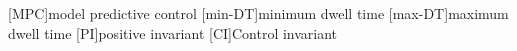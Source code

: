[MPC]{model predictive control}
[min-DT]{minimum dwell time}
[max-DT]{maximum dwell time}
[PI]{positive invariant}
[CI]{Control invariant}
